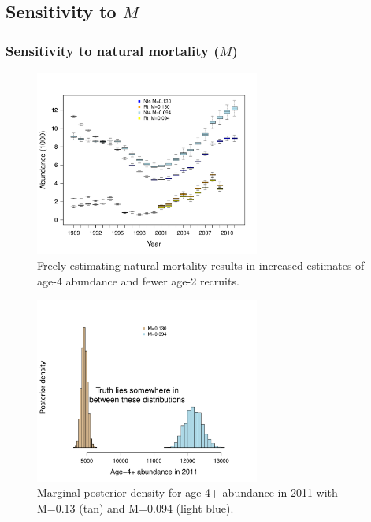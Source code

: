 \documentclass{beamer}
\begin{document}
\subsection{Sensitivity to $M$} %
\label{sub:sensitivity_to_m_}
\begin{frame}[t]\frametitle{Sensitivity to natural mortality ($M$)}
	{
		\begin{figure}[htbp]
			\centering
				\includegraphics[height=2.4in]{../../FIGS/ASMR/fig:bxplt_Nt4_rt_estM.pdf}
			\caption{Freely estimating natural mortality results in increased estimates of age-4 abundance and fewer age-2 recruits.}
			\label{fig:FIGS_ASMR_fig:bxplt_Nt4_rt_estM}
		\end{figure}
	}
	{
		\begin{figure}[htbp]
			\centering
				\includegraphics[height=2.4in]{../../FIGS/ASMR/fig:marg_Nt4_estM.pdf}
			\caption{Marginal posterior density for age-4+ abundance in 2011 with M=0.13 (tan) and M=0.094 (light blue).}
			\label{fig:FIGS_ASMR_fig:marg_Nt4_estM}
		\end{figure}
		
	}
\end{frame}
\end{document}
